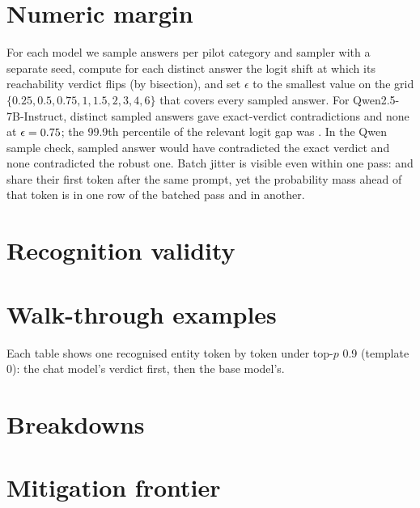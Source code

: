 \documentclass[11pt]{article}
\begin{document}


\appendix
\section{Numeric margin}\label{app:margin}
For each model we sample \gzCalPerCategory{} answers per pilot category and sampler with a separate seed, compute for each distinct answer the logit shift at which its reachability verdict flips (by bisection), and set $\epsilon$ to the smallest value on the grid $\{0.25, 0.5, 0.75, 1, 1.5, 2, 3, 4, 6\}$ that covers every sampled answer. For Qwen2.5-7B-Instruct, \gzCalSeqs{} distinct sampled answers gave \gzCalExact{} exact-verdict contradictions and none at $\epsilon=0.75$; the 99.9th percentile of the relevant logit gap was \gzGapQnine{}. In the Qwen sample check, \gzExactViolations{} sampled answer would have contradicted the exact verdict and none contradicted the robust one. Batch jitter is visible even within one pass: \cwLaterExName{} and \cwLaterExRival{} share their first token after the same prompt, yet the probability mass ahead of that token is \cwJitterA{} in one row of the batched pass and \cwJitterB{} in another.

\section{Recognition validity}\label{app:recognition}




\section{Walk-through examples}\label{app:walk}
Each table shows one recognised entity token by token under top-$p$ 0.9 (template 0): the chat model's verdict first, then the base model's.



\section{Breakdowns}\label{app:breakdowns}








\section{Mitigation frontier}\label{app:frontier}

\end{document}
